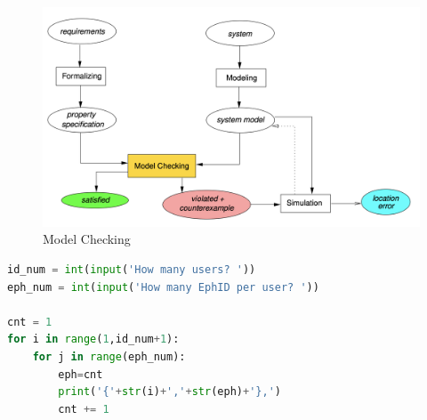 \documentclass[a4paper, twocolumn]{article}
\begin{document}
\begin{figure}[h]
    \centering
    \includegraphics[scale=0.3]{images/modelCheck.png}
    \caption{Model Checking}
    \label{fig:modelCheck} 
\end{figure}
\begin{lstlisting}[language=Python, caption=id,EphID Generator,label={genEph}]
id_num = int(input('How many users? '))
eph_num = int(input('How many EphID per user? '))

cnt = 1
for i in range(1,id_num+1):
    for j in range(eph_num):
        eph=cnt
        print('{'+str(i)+','+str(eph)+'},')
        cnt += 1
\end{lstlisting} 
\end{document}
